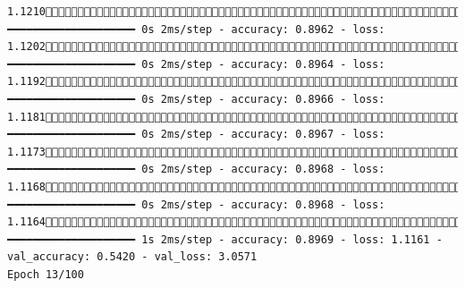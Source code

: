 \documentclass[
  letterpaper,
  DIV=11,
  numbers=noendperiod]{scrartcl}
\begin{document}
\begin{verbatim}
1.1210670/858 ━━━━━━━━━━━━━━━━━━━━ 0s 2ms/step - accuracy: 0.8962 - loss: 1.1202705/858 ━━━━━━━━━━━━━━━━━━━━ 0s 2ms/step - accuracy: 0.8964 - loss: 1.1192741/858 ━━━━━━━━━━━━━━━━━━━━ 0s 2ms/step - accuracy: 0.8966 - loss: 1.1181775/858 ━━━━━━━━━━━━━━━━━━━━ 0s 2ms/step - accuracy: 0.8967 - loss: 1.1173805/858 ━━━━━━━━━━━━━━━━━━━━ 0s 2ms/step - accuracy: 0.8968 - loss: 1.1168835/858 ━━━━━━━━━━━━━━━━━━━━ 0s 2ms/step - accuracy: 0.8968 - loss: 1.1164858/858 ━━━━━━━━━━━━━━━━━━━━ 1s 2ms/step - accuracy: 0.8969 - loss: 1.1161 - val_accuracy: 0.5420 - val_loss: 3.0571
Epoch 13/100

\end{verbatim}
\end{document}
